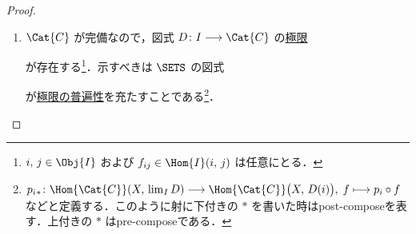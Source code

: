 \documentclass[TQFT_main]{subfiles}
\begin{document}
\begin{proof}
    \begin{enumerate}
        \item $\Cat{C}$ が完備なので，図式 $D \colon I \lto \Cat{C}$ の\hyperref[def:lim]{極限}
        \begin{center}
        \end{center}
        が存在する\footnote{$i,\, j \in \Obj{I}$ および $f_{ij} \in \Hom{I}(i,\, j)$ は任意にとる．}．示すべきは $\SETS$ の図式
        \begin{center}
        \end{center}
        が\hyperref[cmtd:lim]{極限の普遍性}を充たすことである\footnote{$p_i{}_* \colon \Hom{\Cat{C}}(X,\, \lim_I D) \lto \Hom{\Cat{C}} \bigl( X,\, D(i) \bigr),\;  f \lmto p_i \circ f$ などと定義する．このように射に下付きの $*$ を書いた時はpost-composeを表す．上付きの $*$ はpre-composeである．}．


\end{enumerate}
\end{proof}
\end{document}
